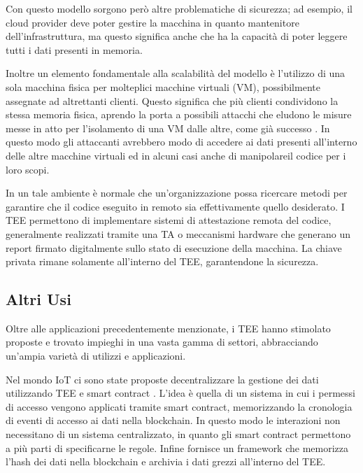 \documentclass[12pt,italian]{report}
\begin{document}
	Con questo modello sorgono però altre problematiche di sicurezza; ad esempio, il cloud provider deve poter gestire la macchina in quanto mantenitore dell'infrastruttura, ma questo significa anche che ha la capacità di poter leggere tutti i dati presenti in memoria.
	
	Inoltre un elemento fondamentale alla scalabilità del modello è l'utilizzo di una sola macchina fisica per molteplici macchine virtuali (VM), possibilmente assegnate ad altrettanti clienti. Questo significa che più clienti condividono la stessa memoria fisica, aprendo la porta a possibili attacchi che eludono le misure messe in atto per l'isolamento di una VM dalle altre, come già successo \cite{vmescape1} \cite{vmescape2} \cite{vmescape3}. In questo modo gli attaccanti avrebbero modo di accedere ai dati presenti all'interno delle altre macchine virtuali ed in alcuni casi anche di manipolareil codice per i loro scopi.
	
	\bigbreak
	
	In un tale ambiente è normale che un'organizzazione possa ricercare metodi per garantire che il codice eseguito in remoto sia effettivamente quello desiderato. I TEE permettono di implementare sistemi di attestazione remota del codice, generalmente realizzati tramite una TA o meccanismi hardware che generano un report firmato digitalmente sullo stato di esecuzione della macchina. La chiave privata rimane solamente all'interno del TEE, garantendone la sicurezza.
	
	\subsection{Altri Usi}
	\label{subsec:altri-usi}
	Oltre alle applicazioni precedentemente menzionate, i TEE hanno stimolato proposte e trovato impieghi in una vasta gamma di settori, abbracciando un'ampia varietà di utilizzi e applicazioni.
	
	\bigbreak
	
	Nel mondo IoT ci sono state proposte decentralizzare la gestione dei dati utilizzando TEE e smart contract \cite{iotblockchain}. L'idea è quella di un sistema in cui i permessi di accesso vengono applicati tramite smart contract, memorizzando la cronologia di eventi di accesso ai dati nella blockchain. In questo modo le interazioni non necessitano di un sistema centralizzato, in quanto gli smart contract permettono a più parti di specificarne le regole. Infine fornisce un framework che memorizza l'hash dei dati nella blockchain e archivia i dati grezzi all'interno del TEE.
	
\end{document}
